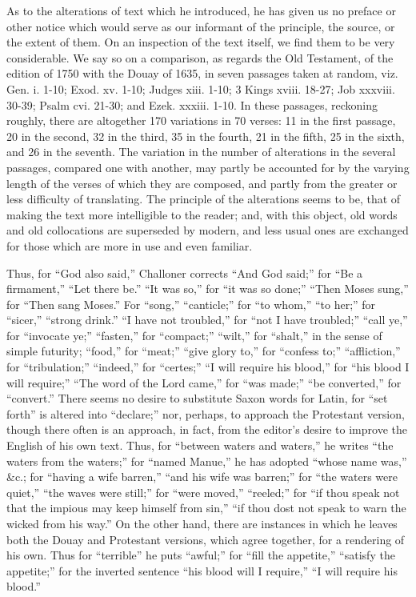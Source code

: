As to the alterations of text which he introduced, he has given us
no preface or other notice which would serve as our informant of the
principle, the source, or the extent of them. On an inspection of the
text itself, we find them to be very considerable. We say so on a
comparison, as regards the Old Testament, of the edition of 1750 with
the Douay of 1635, in seven passages taken at random, viz. Gen. i.
1-10; Exod. xv. 1-10; Judges xiii. 1-10; 3 Kings xviii. 18-27; Job
xxxviii. 30-39; Psalm cvi. 21-30; and Ezek. xxxiii. 1-10. In these
passages, reckoning roughly, there are altogether 170 variations in 70
verses: 11 in the first passage, 20 in the second, 32 in the third, 35
in the fourth, 21 in the fifth, 25 in the sixth, and 26 in the
seventh. The variation in the number of alterations in the
several passages, compared one with another, may partly be accounted
for by the varying length of the verses of which they are composed,
and partly from the greater or less difficulty of translating. The
principle of the alterations seems to be, that of making the text more
intelligible to the reader; and, with this object, old words and old
collocations are superseded by modern, and less usual ones are
exchanged for those which are more in use and even familiar.

Thus, for ``God also said,'' Challoner corrects ``And
God said;'' for ``Be a firmament,'' ``Let there
be.'' ``It was so,'' for ``it was so done;''
``Then Moses sung,'' for ``Then sang Moses.'' For
``song,'' ``canticle;'' for ``to whom,''
``to her;'' for ``sicer,'' ``strong drink.''
``I have not troubled,'' for ``not I have troubled;''
``call ye,'' for ``invocate ye;'' ``fasten,''
for ``compact;'' ``wilt,'' for ``shalt,'' in
the sense of simple futurity; ``food,'' for ``meat;''
``give glory to,'' for ``confess to;''
``affliction,'' for ``tribulation;''
``indeed,'' for ``certes;'' ``I will require his
blood,'' for ``his blood I will require;'' ``The word
of the Lord came,'' for ``was made;'' ``be
converted,'' for ``convert.'' There seems no desire to
substitute Saxon words for Latin, for ``set forth'' is altered
into ``declare;'' nor, perhaps, to approach the Protestant
version, though there often is an approach, in fact, from the editor's
desire to improve the English of his own text. Thus, for ``between
waters and waters,'' he writes ``the waters from the
waters;'' for ``named Manue,'' he has adopted ``whose
name was,'' \&c.; for ``having a wife barren,''
``and his wife was barren;'' for ``the waters were
quiet,'' ``the waves were still;'' for ``were
moved,'' ``reeled;'' for ``if thou speak not that the
impious may keep himself from sin,'' ``if thou dost not speak
to warn the wicked from his way.'' On the other hand, there are
instances in which he leaves both the Douay and Protestant versions,
which agree together, for a rendering of his own. Thus for
``terrible'' he puts ``awful;'' for ``fill the
appetite,'' ``satisfy the appetite;'' for the inverted
sentence ``his blood will I require,'' ``I will require
his blood.''

